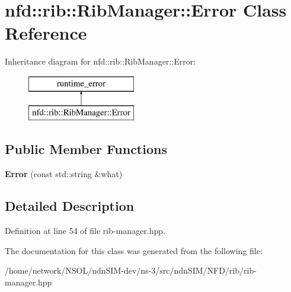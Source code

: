 \hypertarget{classnfd_1_1rib_1_1RibManager_1_1Error}{}\section{nfd\+:\+:rib\+:\+:Rib\+Manager\+:\+:Error Class Reference}
\label{classnfd_1_1rib_1_1RibManager_1_1Error}
Inheritance diagram for nfd\+:\+:rib\+:\+:Rib\+Manager\+:\+:Error\+:\begin{figure}[H]
\begin{center}
\leavevmode
\includegraphics[height=2.000000cm]{classnfd_1_1rib_1_1RibManager_1_1Error}
\end{center}
\end{figure}
\subsection*{Public Member Functions}
\begin{DoxyCompactItemize}
\item 
{\bfseries Error} (const std\+::string \&what)\hypertarget{classnfd_1_1rib_1_1RibManager_1_1Error_a03b2cf367816c2636a101a0ca75ea309}{}\label{classnfd_1_1rib_1_1RibManager_1_1Error_a03b2cf367816c2636a101a0ca75ea309}

\end{DoxyCompactItemize}


\subsection{Detailed Description}


Definition at line 54 of file rib-\/manager.\+hpp.



The documentation for this class was generated from the following file\+:\begin{DoxyCompactItemize}
\item 
/home/network/\+N\+S\+O\+L/ndn\+S\+I\+M-\/dev/ns-\/3/src/ndn\+S\+I\+M/\+N\+F\+D/rib/rib-\/manager.\+hpp\end{DoxyCompactItemize}
